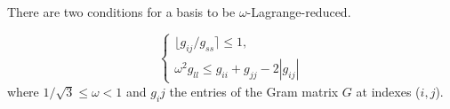 There are two conditions for a basis to be $\omega$-Lagrange-reduced.

\[
\begin{cases}
\lfloor g_{ij} / g_{ss} \rceil \leq 1, \\
\omega^2 g_{ll} \leq g_{ii} + g_{jj} - 2|g_{ij}|

\end{cases}
\]  where $1/\sqrt{3} \leq \omega < 1$ and $g_ij$ the entries of the Gram matrix $G$ at indexes ($i,j$).
